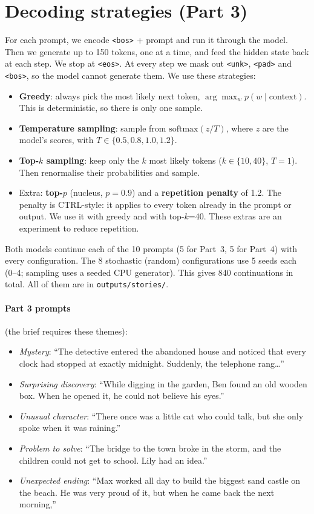 \documentclass[11pt,a4paper]{article}
\begin{document}
\section{Decoding strategies (Part 3)}
\label{sec:decoding}
For each prompt, we encode \texttt{<bos>} + prompt and run it through the model. Then we generate
up to 150 tokens, one at a time, and feed the hidden state back at each step. We stop at
\texttt{<eos>}. At every step we mask out \texttt{<unk>}, \texttt{<pad>} and \texttt{<bos>}, so
the model cannot generate them.
We use these strategies:
\begin{itemize}
\item \textbf{Greedy}: always pick the most likely next token, $\arg\max_w p(w \mid \text{context})$.
  This is deterministic, so there is only one sample.
\item \textbf{Temperature sampling}: sample from $\mathrm{softmax}(z/T)$, where $z$ are the model's
  scores, with $T \in \{0.5, 0.8, 1.0, 1.2\}$.
\item \textbf{Top-$k$ sampling}: keep only the $k$ most likely tokens ($k \in \{10, 40\}$, $T=1$).
  Then renormalise their probabilities and sample.
\item Extra: \textbf{top-$p$} (nucleus, $p=0.9$) and a \textbf{repetition penalty} of 1.2.
  The penalty is CTRL-style: it applies to every token already in the prompt or output. We use
  it with greedy and with top-$k$=40. These extras are an experiment to reduce repetition.
\end{itemize}
Both models continue each of the 10 prompts (5 for Part~3, 5 for Part~4) with every
configuration. The 8 stochastic (random) configurations use 5 seeds each (0--4; sampling uses a
seeded CPU generator). This gives 840 continuations in total. All of them are in
\texttt{outputs/stories/}.

\paragraph{Part 3 prompts} (the brief requires these themes):
\begin{itemize}
\item \emph{Mystery}: ``The detective entered the abandoned house and noticed that every clock
  had stopped at exactly midnight. Suddenly, the telephone rang\dots''
\item \emph{Surprising discovery}: ``While digging in the garden, Ben found an old wooden box.
  When he opened it, he could not believe his eyes.''
\item \emph{Unusual character}: ``There once was a little cat who could talk, but she only spoke
  when it was raining.''
\item \emph{Problem to solve}: ``The bridge to the town broke in the storm, and the children could
  not get to school. Lily had an idea.''
\item \emph{Unexpected ending}: ``Max worked all day to build the biggest sand castle on the
  beach. He was very proud of it, but when he came back the next morning,''
\end{itemize}
\end{document}
